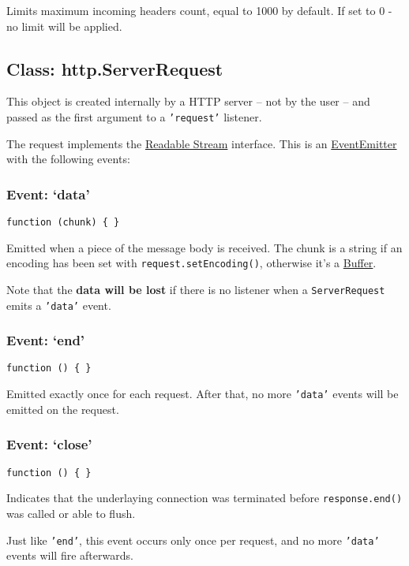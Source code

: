 Limits maximum incoming headers count, equal to 1000 by default. If set
to 0 - no limit will be applied.

\subsection{Class: http.ServerRequest}

This object is created internally by a HTTP server -- not by the user --
and passed as the first argument to a \texttt{'request'} listener.

The request implements the
\href{stream.html\#stream\_readable\_stream}{Readable Stream} interface.
This is an
\href{events.html\#events\_class\_events\_eventemitter}{EventEmitter}
with the following events:

\subsubsection{Event: `data'}

\texttt{function (chunk) \{ \}}

Emitted when a piece of the message body is received. The chunk is a
string if an encoding has been set with \texttt{request.setEncoding()},
otherwise it's a \href{buffer.html\#buffer\_buffer}{Buffer}.

Note that the \textbf{data will be lost} if there is no listener when a
\texttt{ServerRequest} emits a \texttt{'data'} event.

\subsubsection{Event: `end'}

\texttt{function () \{ \}}

Emitted exactly once for each request. After that, no more
\texttt{'data'} events will be emitted on the request.

\subsubsection{Event: `close'}

\texttt{function () \{ \}}

Indicates that the underlaying connection was terminated before
\texttt{response.end()} was called or able to flush.

Just like \texttt{'end'}, this event occurs only once per request, and
no more \texttt{'data'} events will fire afterwards.

